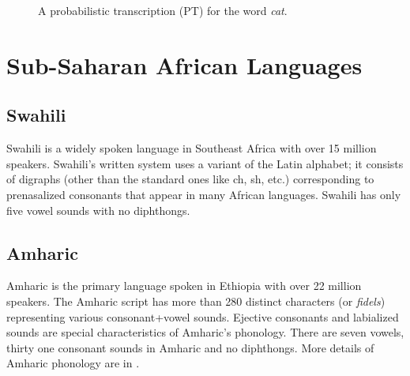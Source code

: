 \documentclass[a4paper]{article}
\newcommand{\mytikzscale}{0.9}
\newcommand{\myvspacefig}{\vspace{-4mm}}
\begin{document}
\begin{figure}
\begin{subfigure}
  \myvspacefig
  \caption{A probabilistic transcription (PT) for the word \emph{cat}.}
  \label{fig:pt}
  \end{subfigure}%
  \vspace{-1mm}
\end{figure}

\section{Sub-Saharan African Languages}  \vspace{-1mm}
\label{sec:Sub-Saharan African Languages}
\subsection{Swahili}  \vspace{-1mm}
Swahili is a widely spoken language in Southeast Africa with over 15 million speakers. Swahili's written system uses a variant of the Latin alphabet; it consists of digraphs (other than the standard ones like ch, sh, etc.) corresponding to prenasalized consonants that appear in many African languages. Swahili has only five vowel sounds with no diphthongs. 

\subsection{Amharic}  
Amharic is the primary language spoken in Ethiopia with over 22 million speakers. The Amharic script has more than 280 distinct characters (or {\em fidels}) representing various consonant+vowel sounds. Ejective consonants and labialized sounds are special characteristics of Amharic's phonology. There are seven vowels, thirty one consonant sounds in Amharic and no diphthongs. More details of Amharic phonology are in \cite{Tachbelie2014}.
\end{document}
